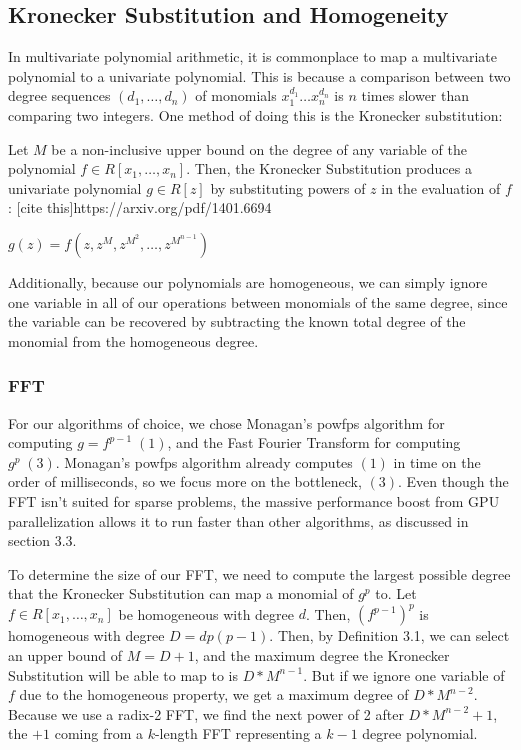 \subsection{Kronecker Substitution and Homogeneity}
In multivariate polynomial arithmetic, it is commonplace to map a multivariate polynomial to a univariate 
polynomial. This is because a comparison between two degree sequences $(d_1, \dots , d_n)$ of monomials 
$x_1^{d_1} \dots x_n^{d_n}$ is $n$ times slower than comparing two integers. One method of doing this is the Kronecker 
substitution:

\begin{defn}
    Let $M$ be a non-inclusive upper bound on the degree of any variable of the polynomial
    $f \in R[x_1, \dots, x_n]$. Then, the Kronecker Substitution produces a univariate polynomial $g \in R[z]$ by substituting powers of $z$ in 
    the evaluation of $f$: [cite this]{https://arxiv.org/pdf/1401.6694}

    \begin{center}
        $g(z) = f(z, z^M, z^{M^2}, \dots, z^{M^{n-1}})$
    \end{center}
\end{defn}

\noindent Additionally, because our polynomials are homogeneous, we can simply ignore one variable in all of our 
operations between monomials of the same degree, since the variable can be recovered by subtracting the 
known total degree of the monomial from the homogeneous degree.

\subsubsection{FFT}

For our algorithms of choice, we chose Monagan's powfps algorithm for computing $g = f^{p-1} \; (1)$, and the 
Fast Fourier Transform for computing $g^p \; (3)$. Monagan's powfps algorithm already computes $(1)$ in time 
on the order of milliseconds, so we focus more on the bottleneck, $(3)$. Even though the FFT isn't suited for 
sparse problems, the massive performance boost from GPU parallelization allows it to run faster than other 
algorithms, as discussed in section 3.3.

To determine the size of our FFT, we need to compute the largest possible degree that the Kronecker 
Substitution can map a monomial of $g^p$ to. Let $f \in R[x_1, \dots, x_n]$ be homogeneous with degree $d$. Then, 
$(f^{p-1})^p$ is homogeneous with degree $D = dp(p - 1)$. Then, by Definition 3.1, we can select an upper bound 
of $M = D + 1$, and the maximum degree the Kronecker Substitution will be able to map to is $D*M^{n - 1}$. But 
if we ignore one variable of $f$ due to the homogeneous property, we get a maximum degree of $D*M^{n - 2}$. 
Because we use a radix-2 FFT, we find the next power of 2 after $D*M^{n - 2} + 1$, the $+1$ coming from a 
$k$-length FFT representing a $k-1$ degree polynomial.

